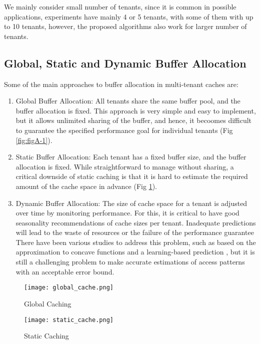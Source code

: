 We mainly consider small number of tenants, since it is common in possible applications, 
experiments have mainly 4 or 5 tenants, with some of them with up to 10 tenants, however, 
the proposed algorithms also work for larger number of tenants.

\subsection{Global, Static and Dynamic Buffer Allocation}

Some of the main approaches to buffer allocation in multi-tenant caches are:

\begin{enumerate}
    \item Global Buffer Allocation: All tenants share the same buffer pool, and the 
    buffer allocation is fixed. This approach is very simple and easy to implement,
    but it allows unlimited sharing of the buffer, and hence, it becoomes difficult to 
    guarantee the specified performance goal for individual tenants
    \cite{article-for-2level-forecasting} (Fig \ref{fig:figA-1}).
    \item Static Buffer Allocation: Each tenant has a fixed buffer size, and the buffer
    allocation is fixed. While straightforward to manage without sharing, a critical 
    downside of static caching is that it is hard to estimate the required amount of 
    the cache space in advance \cite{article-for-2level-forecasting} (Fig \ref{fig:figB-1}).
    \item Dynamic Buffer Allocation: The size of cache space for a tenant is adjusted 
    over time by monitoring performance. For this, it is critical to have good seasonality
    recommendations of cache sizes per tenant. Inadequate predictions will lead to the waste
    of resources or the failure of the performance guarantee \cite{article-for-2level-forecasting}
    There have been various studies to address this problem, such as based on the 
    approximation to concave functions \cite{approx-concave-functions} and a 
    learning-based prediction \cite{learning-based-prediction}, but it is still a 
    challenging problem to make accurate estimations of access patterns with an 
    acceptable error bound.
\end{enumerate}

\begin{figure}[H]
    \centering
    \begin{minipage}{0.4\textwidth}
        \centering
        \texttt{[image: global\_cache.png]}
        \caption{Global Caching}
        \label{fig:figA-1}
    \end{minipage}
    \hfill
    \begin{minipage}{0.4\textwidth}
        \centering
        \texttt{[image: static\_cache.png]}
        \caption{Static Caching}
        \label{fig:figB-1}
    \end{minipage}
\end{figure}

